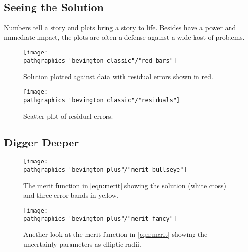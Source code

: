 \subsection{Seeing the Solution}  %

Numbers tell a story and plots bring a story to life. Besides have a power and immediate impact, the plots are often a defense against a wide host of problems.

\begin{figure}[htbp] %
   \centering
   \texttt{[image: \\pathgraphics "bevington classic"/"red bars"]} 
   \caption[Solution plotted against data with residual errors shown in red.]{Solution plotted against data with residual errors shown in red.}
   \label{fig:bevington soln v data}
\end{figure}

\begin{figure}[htbp] %
   \centering
   \texttt{[image: \\pathgraphics "bevington classic"/"residuals"]} 
   \caption[Scatter plot of residual errors.]{Scatter plot of residual errors.}
   \label{fig:bevington residuals}
\end{figure}

\subsection{Digger Deeper}  %

\begin{figure}[htbp] %
   \centering
   \texttt{[image: \\pathgraphics "bevington plus"/"merit bullseye"]} 
   \caption[The merit function.]{The merit function in \eqref{eqn:merit} showing the solution (white cross) and three error bands in yellow.}
   \label{fig:bevington merit function}
\end{figure}

\begin{figure}[htbp] %
   \centering
   \texttt{[image: \\pathgraphics "bevington plus"/"merit fancy"]} 
   \caption[Another look at the merit function.]{Another look at the merit function in \eqref{eqn:merit} showing the uncertainty parameters as elliptic radii.}
\end{figure}

